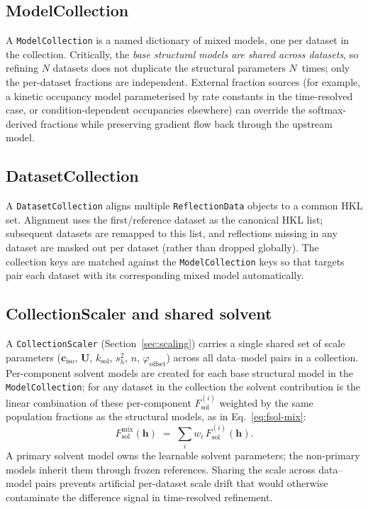 \documentclass{iucrjournals}
\begin{document}
\subsection{ModelCollection}

A \texttt{ModelCollection} is a named dictionary of mixed models, one
per dataset in the collection.  Critically, the \emph{base structural
models are shared across datasets}, so refining $N$ datasets does not
duplicate the structural parameters $N$~times; only the per-dataset
fractions are independent.  External fraction sources (for example, a
kinetic occupancy model parameterised by rate constants in the
time-resolved case, or condition-dependent occupancies elsewhere) can
override the softmax-derived fractions while preserving gradient flow
back through the upstream model.

\subsection{DatasetCollection}

A \texttt{DatasetCollection} aligns multiple \texttt{ReflectionData}
objects to a common HKL set.  Alignment uses the first/reference dataset
as the canonical HKL list; subsequent datasets are remapped to this list,
and reflections missing in any dataset are masked out per dataset (rather
than dropped globally).  The collection keys are matched against the
\texttt{ModelCollection} keys so that targets pair each dataset with its
corresponding mixed model automatically.

\subsection{CollectionScaler and shared solvent}

A \texttt{CollectionScaler} (Section~\ref{sec:scaling}) carries a single
shared set of scale parameters ($\mathbf{c}_\mathrm{iso}$, $\mathbf{U}$,
$k_\mathrm{sol}$, $s_{h}^{2}$, $n$, $\varphi_\mathrm{offset}$) across all
data--model pairs in a collection.  Per-component solvent models are
created for each base structural model in the
\texttt{ModelCollection}; for any dataset in the collection the solvent
contribution is the linear combination of these per-component
$F_\mathrm{sol}^{(i)}$ weighted by the same population fractions as the
structural models, as in Eq.~\ref{eq:fsol-mix}:
%
\begin{equation}
  F_\mathrm{sol}^\mathrm{mix}(\mathbf{h})
  \;=\; \sum_{i} w_{i}\, F_\mathrm{sol}^{(i)}(\mathbf{h}).
  \label{eq:fsol-mix}
\end{equation}
%
A primary solvent model owns the learnable solvent parameters; the
non-primary models inherit them through frozen references.  Sharing the
scale across data--model pairs prevents artificial per-dataset scale
drift that would otherwise contaminate the difference signal in
time-resolved refinement.
\end{document}

